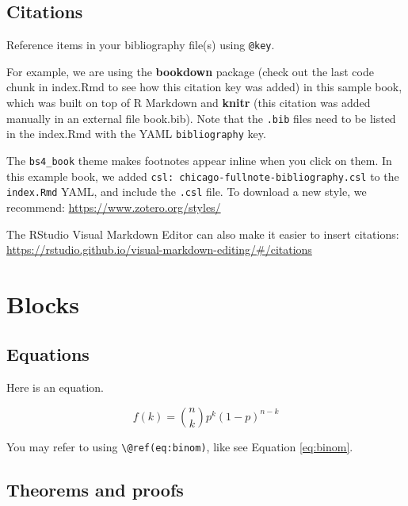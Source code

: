 \documentclass[
]{book}
\theoremstyle{definition}
\theoremstyle{definition}
\theoremstyle{definition}
\theoremstyle{definition}
\theoremstyle{remark}
\begin{document}
\section{Citations}\label{citations}

Reference items in your bibliography file(s) using \texttt{@key}.

\citet{burkner_brms_2017}
\citet{wickham_dplyr_2023}

For example, we are using the \textbf{bookdown} package \citep{R-bookdown} (check out the last code chunk in index.Rmd to see how this citation key was added) in this sample book, which was built on top of R Markdown and \textbf{knitr} \citep{xie2015} (this citation was added manually in an external file book.bib).
Note that the \texttt{.bib} files need to be listed in the index.Rmd with the YAML \texttt{bibliography} key.

The \texttt{bs4\_book} theme makes footnotes appear inline when you click on them. In this example book, we added \texttt{csl:\ chicago-fullnote-bibliography.csl} to the \texttt{index.Rmd} YAML, and include the \texttt{.csl} file. To download a new style, we recommend: \url{https://www.zotero.org/styles/}

The RStudio Visual Markdown Editor can also make it easier to insert citations: \url{https://rstudio.github.io/visual-markdown-editing/\#/citations}

\chapter{Blocks}\label{blocks}

\section{Equations}\label{equations}

Here is an equation.

\begin{equation} 
  f\left(k\right) = \binom{n}{k} p^k\left(1-p\right)^{n-k}
  \label{eq:binom}
\end{equation}

You may refer to using \texttt{\textbackslash{}@ref(eq:binom)}, like see Equation \eqref{eq:binom}.

\section{Theorems and proofs}\label{theorems-and-proofs}
\end{document}
